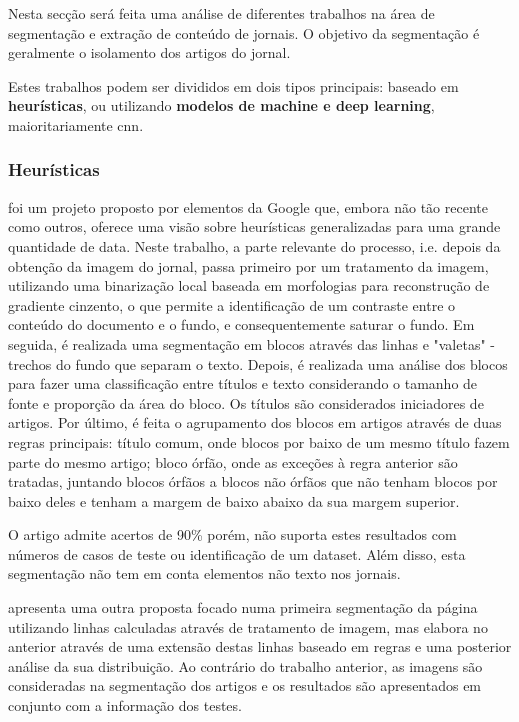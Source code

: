 Nesta secção será feita uma análise de diferentes trabalhos na área de segmentação e extração de conteúdo de jornais. O objetivo da segmentação é geralmente o isolamento dos artigos do jornal.

Estes trabalhos podem ser divididos em dois tipos principais: baseado em \textbf{heurísticas}, ou utilizando \textbf{modelos de machine e deep learning}, maioritariamente \acrshort{cnn}.


\subsubsection{Heurísticas}

\cite{5277572} foi um projeto proposto por elementos da Google que, embora não tão recente como outros, oferece uma visão sobre heurísticas generalizadas para uma grande quantidade de data. Neste trabalho, a parte relevante do processo, i.e. depois da obtenção da imagem do jornal, passa primeiro por um tratamento da imagem, utilizando uma binarização local baseada em morfologias para reconstrução de gradiente cinzento, o que permite a identificação de um contraste entre o conteúdo do documento e o fundo, e consequentemente saturar o fundo. Em seguida, é realizada uma segmentação em blocos através das linhas e "valetas" - trechos do fundo que separam o texto. Depois, é realizada uma análise dos blocos para fazer uma classificação entre títulos e texto considerando o tamanho de fonte e proporção da área do bloco. Os títulos são considerados iniciadores de artigos. Por último, é feita o agrupamento dos blocos em artigos através de duas regras principais: título comum, onde blocos por baixo de um mesmo título fazem parte do mesmo artigo; bloco órfão, onde as exceções à regra anterior são tratadas, juntando blocos órfãos a blocos não órfãos que não tenham blocos por baixo deles e tenham a margem de baixo abaixo da sua margem superior.

O artigo admite acertos de 90\% porém, não suporta estes resultados com números de casos de teste ou identificação de um dataset. Além disso, esta segmentação não tem em conta elementos não texto nos jornais.

\hspace{10pt}

\cite{8300390} apresenta uma outra proposta focado numa primeira segmentação da página utilizando linhas calculadas através de tratamento de imagem, mas elabora no anterior através de uma extensão destas linhas baseado em regras e uma posterior análise da sua distribuição. Ao contrário do trabalho anterior, as imagens são consideradas na segmentação dos artigos e os resultados são apresentados em conjunto com a informação dos testes.

